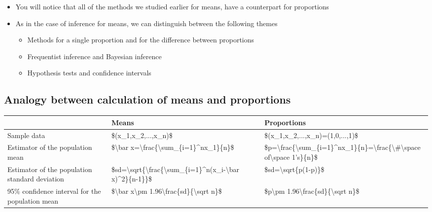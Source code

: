 \documentclass[
]{book}
\providecommand{\tightlist}{%
  \setlength{\itemsep}{0pt}\setlength{\parskip}{0pt}}
\begin{document}
\begin{itemize}
\tightlist
\item
  You will notice that all of the methods we studied earlier for means, have a counterpart for proportions
\item
  As in the case of inference for means, we can distinguish between the following themes

  \begin{itemize}
  \tightlist
  \item
    Methods for a single proportion and for the difference between proportions
  \item
    Frequentist inference and Bayesian inference
  \item
    Hypothesis tests and confidence intervals
  \end{itemize}
\end{itemize}

\hypertarget{analogy-between-calculation-of-means-and-proportions}{%
\subsection{Analogy between calculation of means and proportions}\label{analogy-between-calculation-of-means-and-proportions}}

\begin{tabular}{l|l|l}
\hline
  & Means & Proportions\\
\hline
Sample data & \$(x\_1,x\_2,...,x\_n)\$ & \$(x\_1,x\_2,...,x\_n)=(1,0,...,1)\$\\
\hline
Estimator of the population mean & \$\textbackslash{}bar x=\textbackslash{}frac\{\textbackslash{}sum\_\{i=1\}\textasciicircum{}nx\_1\}\{n\}\$ & \$p=\textbackslash{}frac\{\textbackslash{}sum\_\{i=1\}\textasciicircum{}nx\_1\}\{n\}=\textbackslash{}frac\{\textbackslash{}\#\textbackslash{}space of\textbackslash{}space 1's\}\{n\}\$\\
\hline
Estimator of the population standard deviation & \$sd=\textbackslash{}sqrt\{\textbackslash{}frac\{\textbackslash{}sum\_\{i=1\}\textasciicircum{}n(x\_i-\textbackslash{}bar x)\textasciicircum{}2\}\{n-1\}\}\$ & \$sd=\textbackslash{}sqrt\{p(1-p)\}\$\\
\hline
95\% confidence interval for the population mean & \$\textbackslash{}bar x\textbackslash{}pm 1.96\textbackslash{}frac\{sd\}\{\textbackslash{}sqrt n\}\$ & \$p\textbackslash{}pm 1.96\textbackslash{}frac\{sd\}\{\textbackslash{}sqrt n\}\$\\
\hline
\end{tabular}
\end{document}
